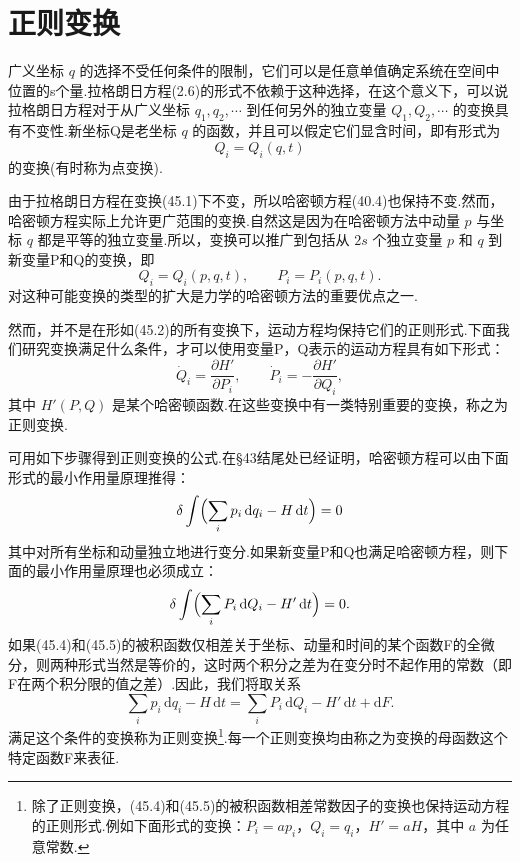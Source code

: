 \section{正则变换}

广义坐标 $q$
的选择不受任何条件的限制，它们可以是任意单值确定系统在空间中位置的s个量.拉格朗日方程(2.6)的形式不依赖于这种选择，在这个意义下，可以说拉格朗日方程对于从广义坐标
$q_1,q_2,\cdots$ 到任何另外的独立变量 $Q_1,Q_2,\cdots$
的变换具有不变性.新坐标Q是老坐标 $q$
的函数，并且可以假定它们显含时间，即有形式为
\begin{equation}
  Q_i=Q_i(q,t)
\end{equation}
的变换(有时称为点变换).

由于拉格朗日方程在变换(45.1)下不变，所以哈密顿方程(40.4)也保持不变.然而，哈密顿方程实际上允许更广范围的变换.自然这是因为在哈密顿方法中动量
$p$ 与坐标 $q$
都是平等的独立变量.所以，变换可以推广到包括从 $2s$
个独立变量 $p$ 和 $q$ 到新变量P和Q的变换，即
\begin{equation}
  Q_i=Q_i(p,q,t),\qquad P_i=P_i(p,q,t).
\end{equation}
对这种可能变换的类型的扩大是力学的哈密顿方法的重要优点之一.

然而，并不是在形如(45.2)的所有变换下，运动方程均保持它们的正则形式.下面我们研究变换满足什么条件，才可以使用变量P，Q表示的运动方程具有如下形式：
\begin{equation}
  \dot{Q}_i=\frac{\partial H'}{\partial P_i},\qquad
  \dot{P}_i=-\frac{\partial H'}{\partial Q_i},
\end{equation}
其中 $H'(P,Q)$
是某个哈密顿函数.在这些变换中有一类特别重要的变换，称之为正则变换.

可用如下步骤得到正则变换的公式.在§43结尾处已经证明，哈密顿方程可以由下面形式的最小作用量原理推得：
\begin{equation}
  \delta\int\Bigl(\sum_i p_i\,\mathrm{d}q_i-H\,\mathrm{d}t\Bigr)=0
\end{equation}
其中对所有坐标和动量独立地进行变分.如果新变量P和Q也满足哈密顿方程，则下面的最小作用量原理也必须成立：
\begin{equation}
  \delta\int\Bigl(\sum_i P_i\,\mathrm{d}Q_i-H'\,\mathrm{d}t\Bigr)=0.
\end{equation}
如果(45.4)和(45.5)的被积函数仅相差关于坐标、动量和时间的某个函数F的全微分，则两种形式当然是等价的，这时两个积分之差为在变分时不起作用的常数（即F在两个积分限的值之差）.因此，我们将取关系
\begin{equation*}
  \sum_i p_i\,\mathrm{d}q_i-H\,\mathrm{d}t
  =\sum_i P_i\,\mathrm{d}Q_i-H'\,\mathrm{d}t+\mathrm{d}F.
\end{equation*}
满足这个条件的变换称为正则变换\footnote{除了正则变换，(45.4)和(45.5)的被积函数相差常数因子的变换也保持运动方程的正则形式.例如下面形式的变换：$P_i=ap_i$，$Q_i=q_i$，$H'=aH$，其中 $a$ 为任意常数.}.每一个正则变换均由称之为变换的母函数这个特定函数F来表征.

